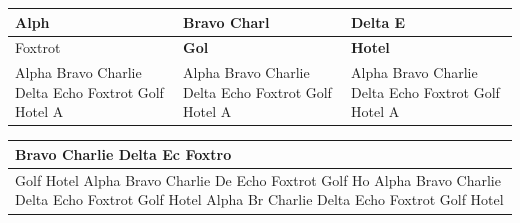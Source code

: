 \documentclass[11pt,a4paper]{article}
\begin{document}
\begin{table}[h]
\begin{tabular}{|l|l|l|}
\hline
Alph & Bravo Charl & Delta E \\ \hline
Foxtrot  & \textbf{Gol} & \textbf{Hotel} \\ \hline
Alpha Bravo  Charlie Delta Echo Foxtrot Golf Hotel A & Alpha Bravo  Charlie Delta Echo Foxtrot Golf Hotel A & Alpha Bravo  Charlie Delta Echo Foxtrot Golf Hotel A \\ \hline
\end{tabular}
\end{table}

\begin{table}[h]
\begin{tabular}{|l|}
\hline
Bravo Charlie Delta Ec  Foxtro \\ \hline
Golf Hotel Alpha Bravo Charlie De  Echo Foxtrot Golf Ho  Alpha Bravo Charlie Delta Echo Foxtrot  Golf Hotel Alpha Br  Charlie Delta Echo Foxtrot Golf Hotel \\ \hline
\end{tabular}
\end{table}
\end{document}
